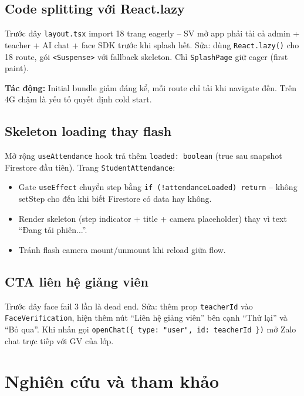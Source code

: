 \documentclass{article}
\begin{document}
\subsection{Code splitting với React.lazy}

Trước đây \texttt{layout.tsx} import 18 trang eagerly -- SV mở app phải tải cả admin + teacher + AI chat + face SDK trước khi splash hết. Sửa: dùng \texttt{React.lazy()} cho 18 route, gói \texttt{<Suspense>} với fallback skeleton. Chỉ \texttt{SplashPage} giữ eager (first paint).

\textbf{Tác động:} Initial bundle giảm đáng kể, mỗi route chỉ tải khi navigate đến. Trên 4G chậm là yếu tố quyết định cold start.

\subsection{Skeleton loading thay flash}

Mở rộng \texttt{useAttendance} hook trả thêm \texttt{loaded: boolean} (true sau snapshot Firestore đầu tiên). Trang \texttt{StudentAttendance}:

\begin{itemize}[leftmargin=1.5em]
  \item Gate \texttt{useEffect} chuyển step bằng \texttt{if (!attendanceLoaded) return} -- không setStep cho đến khi biết Firestore có data hay không.
  \item Render skeleton (step indicator + title + camera placeholder) thay vì text ``Đang tải phiên...''.
  \item Tránh flash camera mount/unmount khi reload giữa flow.
\end{itemize}

\subsection{CTA liên hệ giảng viên}

Trước đây face fail 3 lần là dead end. Sửa: thêm prop \texttt{teacherId} vào \texttt{FaceVerification}, hiện thêm nút ``Liên hệ giảng viên'' bên cạnh ``Thử lại'' và ``Bỏ qua''. Khi nhấn gọi \texttt{openChat(\{ type: "user", id: teacherId \})} mở Zalo chat trực tiếp với GV của lớp.

\section{Nghiên cứu và tham khảo}
\end{document}
